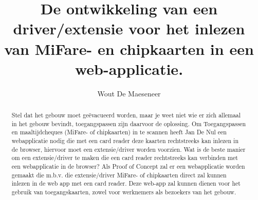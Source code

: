 \documentclass{hogent-article}
\title{De ontwikkeling van een driver/extensie voor het inlezen van MiFare- en chipkaarten in een web-applicatie.}
\author{Wout De Maeseneer}
\begin{document}
    
    \begin{abstract}
        Stel dat het gebouw moet geëvacueerd worden, maar je weet niet wie er zich allemaal in het gebouw bevindt, toegangspassen zijn daarvoor de oplossing.
        Om Toegangspassen en maaltijdcheques (MiFare- of chipkaarten) in te scannen heeft Jan De Nul een webapplicatie nodig die met een card reader deze kaarten rechtstreeks kan inlezen in de browser, hiervoor moet een extensie/driver worden voorzien.
        Wat is de beste manier om een extensie/driver te maken die een card reader rechtstreeks kan verbinden met een webapplicatie in de browser? 
        Als Proof of Concept zal er een webapplicatie worden gemaakt die m.b.v. die extensie/driver MiFare- of chipkaarten direct zal kunnen inlezen in de web app met een card reader. Deze web-app zal kunnen dienen voor het gebruik van toegangskaarten, zowel voor werknemers als bezoekers van het gebouw.
    \end{abstract}
    
    \tableofcontents
    
    
    
    \printbibliography[heading=bibintoc]
    
    
\end{document}
